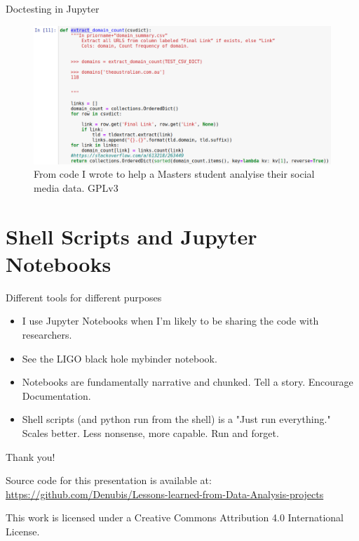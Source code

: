 \documentclass[aspectratio=1610, 11pt]{beamer} %
\begin{document}
\begin{frame}{Doctesting in Jupyter}
\begin{figure}
    \includegraphics[height=.75\textheight]{figures/jupyterDoctest.png}
    \caption{From code I wrote to help a Masters student analyise their social media data. GPLv3}
    \label{fig:analysis}
\end{figure}
\end{frame}
\section{Shell Scripts and Jupyter Notebooks}
\begin{frame}{Different tools for different purposes}
\begin{itemize}[label=\textbullet]
    \item I use Jupyter Notebooks when I'm likely to be sharing the code with researchers.
    \item See the LIGO black hole mybinder notebook.
    \item Notebooks are fundamentally narrative and chunked. Tell a story. Encourage Documentation.
    \item Shell scripts (and python run from the shell) is a "Just run everything." Scales better. Less nonsense, more capable. Run and forget.
\end{itemize}

\end{frame}


\begin{frame}{Thank you!}


Source code for this presentation is available at: \url{https://github.com/Denubis/Lessons-learned-from-Data-Analysis-projects}

This work is licensed under a Creative Commons Attribution 4.0 International License.

\end{frame}
\end{document}
